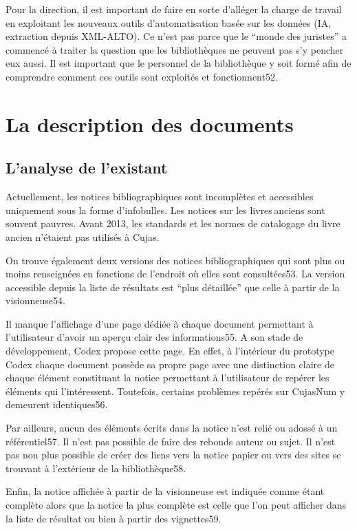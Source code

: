 Pour la direction, il est important de faire en sorte d’alléger la charge de travail en exploitant les nouveaux outils d’automatisation basée sur les données (IA, extraction depuis XML-ALTO). Ce n’est pas parce que le \enquote{monde des juristes} a commencé à traiter la question que les bibliothèques ne peuvent pas s’y pencher eux aussi. Il est important que le personnel de la bibliothèque y soit formé afin de comprendre comment ces outils sont exploités et fonctionnent52. 



\section{La description des documents}

\subsection{L’analyse de l’existant}

Actuellement, les notices bibliographiques sont incomplètes et accessibles uniquement sous la forme d’infobulles.  Les notices sur les livres anciens sont souvent pauvres. Avant 2013, les standards et les normes de catalogage du livre ancien n’étaient pas utilisés à Cujas.  

On trouve également deux versions des notices bibliographiques qui sont plus ou moins renseignées en fonctions de l’endroit où elles sont consultées53. La version accessible depuis la liste de résultats est \enquote{plus détaillée} que celle à partir de la visionneuse54.  

Il manque l’affichage d’une page dédiée à chaque document permettant à l’utilisateur d’avoir un aperçu clair des informations55. A son stade de développement, Codex propose cette page. En effet, à l’intérieur du prototype Codex chaque document possède sa propre page avec une distinction claire de chaque élément constituant la notice permettant à l’utilisateur de repérer les éléments qui l’intéressent. Toutefois, certains problèmes repérés sur CujasNum y demeurent identiques56.  

Par ailleurs, aucun des éléments écrits dans la notice n’est relié ou adossé à un référentiel57. Il n’est pas possible de faire des rebonds auteur ou sujet. Il n’est pas non plus possible de créer des liens vers la notice papier ou vers des sites se trouvant à l’extérieur de la bibliothèque58.  

Enfin, la notice affichée à partir de la visionneuse est indiquée comme étant complète alors que la notice la plus complète est celle que l’on peut afficher dans la liste de résultat ou bien à partir des vignettes59.  

